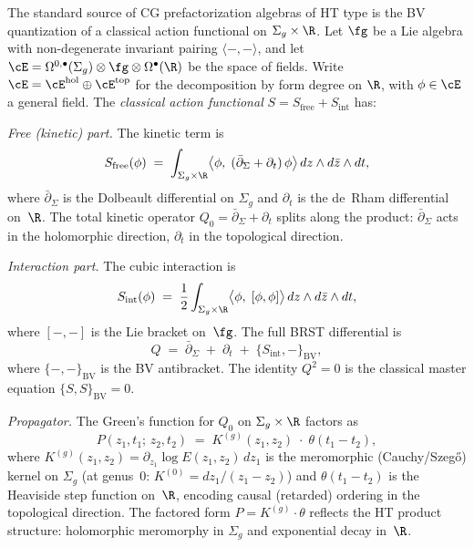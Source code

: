 \begin{definition}
\label{def:BV-origin}
The standard source of CG prefactorization algebras of HT type is
the BV quantization of a classical action functional on
$\Sigma_g \times \R$. Let $\fg$ be a Lie algebra with
non-degenerate invariant pairing $\langle{-},{-}\rangle$, and
let $\cE = \Omega^{0,\bullet}(\Sigma_g) \otimes \fg \otimes
\Omega^\bullet(\R)$ be the space of fields. Write
$\cE = \cE^{\mathrm{hol}} \oplus \cE^{\mathrm{top}}$ for the
decomposition by form degree on $\R$, with $\phi \in \cE$ a
general field. The \emph{classical action functional}
$S = S_{\mathrm{free}} + S_{\mathrm{int}}$ has:

\smallskip\noindent
\emph{Free (kinetic) part.} The kinetic term is
\begin{equation}\label{eq:HT-kinetic}
 S_{\mathrm{free}}(\phi)
 \;=\;
 \int_{\Sigma_g \times \R}
 \bigl\langle \phi,\;
 (\bar\partial_{\Sigma} + \partial_t)\, \phi
 \bigr\rangle\,
 dz \wedge d\bar{z} \wedge dt,
\end{equation}
where $\bar\partial_{\Sigma}$ is the Dolbeault differential on
$\Sigma_g$ and $\partial_t$ is the de~Rham differential on~$\R$.
The total kinetic operator $Q_0 = \bar\partial_{\Sigma} + \partial_t$
splits along the product: $\bar\partial_\Sigma$ acts in the
holomorphic direction, $\partial_t$ in the topological direction.

\smallskip\noindent
\emph{Interaction part.} The cubic interaction is
\begin{equation}\label{eq:HT-interaction}
 S_{\mathrm{int}}(\phi)
 \;=\;
 \frac{1}{2}
 \int_{\Sigma_g \times \R}
 \bigl\langle \phi,\;
 [\phi, \phi]
 \bigr\rangle\,
 dz \wedge d\bar{z} \wedge dt,
\end{equation}
where $[{-},{-}]$ is the Lie bracket on~$\fg$. The full BRST
differential is
\begin{equation}\label{eq:BRST-splitting}
 Q
 \;=\;
 \bar\partial_{\Sigma}
 \;+\;
 \partial_t
 \;+\;
 \{S_{\mathrm{int}},{-}\}_{\mathrm{BV}},
\end{equation}
where $\{{-},{-}\}_{\mathrm{BV}}$ is the BV antibracket. The
identity $Q^2 = 0$ is the classical master equation
$\{S,S\}_{\mathrm{BV}} = 0$.

\smallskip\noindent
\emph{Propagator.} The Green's function for $Q_0$ on
$\Sigma_g \times \R$ factors as
\begin{equation}\label{eq:HT-propagator}
 P(z_1, t_1;\, z_2, t_2)
 \;=\;
 K^{(g)}(z_1, z_2)
 \;\cdot\;
 \theta(t_1 - t_2),
\end{equation}
where $K^{(g)}(z_1,z_2) = \partial_{z_1}\log E(z_1,z_2)\,dz_1$
is the meromorphic (Cauchy/Szeg\H{o}) kernel on $\Sigma_g$
(at genus~$0$: $K^{(0)} = dz_1/(z_1 - z_2)$) and
$\theta(t_1 - t_2)$ is the Heaviside step function on~$\R$,
encoding causal (retarded) ordering in the topological direction.
The factored form $P = K^{(g)} \cdot \theta$ reflects the
HT product structure: holomorphic meromorphy in $\Sigma_g$
and exponential decay in~$\R$.


\end{definition}
